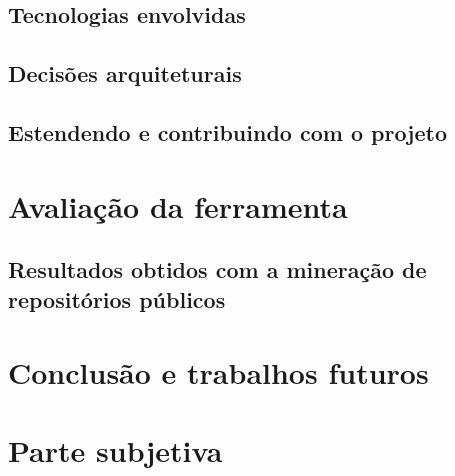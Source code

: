 \documentclass[a4paper, 12pt, twoside]{book}
\begin{document}
    \section{Tecnologias envolvidas}
    
    \section{Decisões arquiteturais}
    
    \section{Estendendo e contribuindo com o projeto}
    
\chapter{Avaliação da ferramenta}

    \section{Resultados obtidos com a mineração de repositórios públicos}

\chapter{Conclusão e trabalhos futuros}

\chapter{Parte subjetiva}



\end{document}
